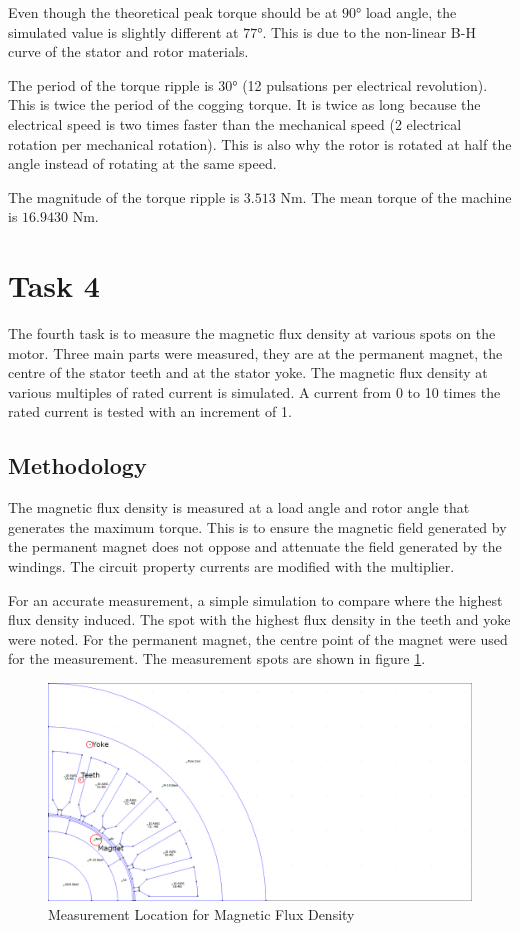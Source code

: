 \documentclass[12pt]{article}
\begin{document}
Even though the theoretical peak torque should be at $\ang{90}$ load angle, the simulated value is slightly different at $\ang{77}$. This is due to the non-linear B-H curve of the stator and rotor materials.

The period of the torque ripple is $\ang{30}$ (12 pulsations per electrical revolution). This is twice the period of the cogging torque. It is twice as long because the electrical speed is two times faster than the mechanical speed (2 electrical rotation per mechanical rotation). This is also why the rotor is rotated at half the angle instead of rotating at the same speed.

The magnitude of the torque ripple is $3.513$ Nm. The mean torque of the machine is $16.9430$ Nm.

\section{Task 4}

The fourth task is to measure the magnetic flux density at various spots on the motor. Three main parts were measured, they are at the permanent magnet, the centre of the stator teeth and at the stator yoke. The magnetic flux density at various multiples of rated current is simulated. A current from 0 to 10 times the rated current is tested with an increment of 1.

\subsection{Methodology}

The magnetic flux density is measured at a load angle and rotor angle that generates the maximum torque. This is to ensure the magnetic field generated by the permanent magnet does not oppose and attenuate the field generated by the windings. The circuit property currents are modified with the multiplier.

For an accurate measurement, a simple simulation to compare where the highest flux density induced. The spot with the highest flux density in the teeth and yoke were noted. For the permanent magnet, the centre point of the magnet were used for the measurement. The measurement spots are shown in figure \ref{fig:task-4-measurement}.

\begin{figure}[h]
    \centering
    \includegraphics[width=1\linewidth]{img/task_4_measurement_edited.png}
    \caption{Measurement Location for Magnetic Flux Density}
    \label{fig:task-4-measurement}
\end{figure}
\end{document}
